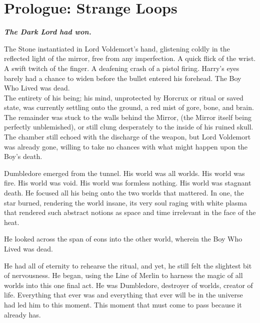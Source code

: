 \chapter*{Prologue: Strange Loops}

\textbf{\textit{The Dark Lord had won.}}\par
\simpleline



The Stone instantiated in Lord Voldemort’s hand, glistening coldly in the reflected light of the mirror, free from any imperfection.
\SmallVSpace
A quick flick of the wrist.
\SmallVSpace
A swift twitch of the finger.
\SmallVSpace
A deafening crash of a pistol firing.
\SmallVSpace
Harry’s eyes barely had a chance to widen before the bullet entered his forehead.
\SmallVSpace
The Boy Who Lived was dead.
\\
The entirety of his being; his mind, unprotected by Horcrux or ritual or saved state, was currently settling onto the ground, a red mist of gore, bone, and brain. The remainder was stuck to the walls behind the Mirror, (the Mirror itself being perfectly unblemished), or still clung desperately to the inside of his ruined skull. The chamber still echoed with the discharge of the weapon, but Lord Voldemort was already gone, willing to take no chances with what might happen upon the Boy’s death.

\simpleline


Dumbledore emerged from the tunnel. His world was all worlds. His world was fire. His world was void. His world was formless nothing. His world was stagnant death. He focused all his being onto the two worlds that mattered. In one, the star burned, rendering the world insane, its very soul raging with white plasma that rendered such abstract notions as space and time irrelevant in the face of the heat.

He looked across the span of eons into the other world, wherein the Boy Who Lived was dead.

He had all of eternity to rehearse the ritual, and yet, he still felt the slightest bit of nervousness. He began, using the Line of Merlin to harness the magic of all worlds into this one final act. He was Dumbledore, destroyer of worlds, creator of life. Everything that ever was and everything that ever will be in the universe had led him to this moment. This moment that must come to pass because it already has.

